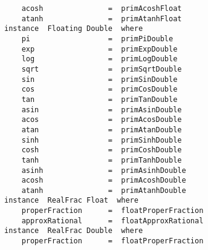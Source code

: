 \mbox{\tt \ \ \ \ acosh\ \ \ \ \ \ \ \ \ \ \ \ \ \ \ =\ \ primAcoshFloat}\\
\mbox{\tt \ \ \ \ atanh\ \ \ \ \ \ \ \ \ \ \ \ \ \ \ =\ \ primAtanhFloat}
\eprogB\noindent\bprogB
\mbox{\tt instance\ \ Floating\ Double\ \ where}\\
\mbox{\tt \ \ \ \ pi\ \ \ \ \ \ \ \ \ \ \ \ \ \ \ \ \ \ =\ \ primPiDouble}\\
\mbox{\tt \ \ \ \ exp\ \ \ \ \ \ \ \ \ \ \ \ \ \ \ \ \ =\ \ primExpDouble}\\
\mbox{\tt \ \ \ \ log\ \ \ \ \ \ \ \ \ \ \ \ \ \ \ \ \ =\ \ primLogDouble}\\
\mbox{\tt \ \ \ \ sqrt\ \ \ \ \ \ \ \ \ \ \ \ \ \ \ \ =\ \ primSqrtDouble}\\
\mbox{\tt \ \ \ \ sin\ \ \ \ \ \ \ \ \ \ \ \ \ \ \ \ \ =\ \ primSinDouble}\\
\mbox{\tt \ \ \ \ cos\ \ \ \ \ \ \ \ \ \ \ \ \ \ \ \ \ =\ \ primCosDouble}\\
\mbox{\tt \ \ \ \ tan\ \ \ \ \ \ \ \ \ \ \ \ \ \ \ \ \ =\ \ primTanDouble}\\
\mbox{\tt \ \ \ \ asin\ \ \ \ \ \ \ \ \ \ \ \ \ \ \ \ =\ \ primAsinDouble}\\
\mbox{\tt \ \ \ \ acos\ \ \ \ \ \ \ \ \ \ \ \ \ \ \ \ =\ \ primAcosDouble}\\
\mbox{\tt \ \ \ \ atan\ \ \ \ \ \ \ \ \ \ \ \ \ \ \ \ =\ \ primAtanDouble}\\
\mbox{\tt \ \ \ \ sinh\ \ \ \ \ \ \ \ \ \ \ \ \ \ \ \ =\ \ primSinhDouble}\\
\mbox{\tt \ \ \ \ cosh\ \ \ \ \ \ \ \ \ \ \ \ \ \ \ \ =\ \ primCoshDouble}\\
\mbox{\tt \ \ \ \ tanh\ \ \ \ \ \ \ \ \ \ \ \ \ \ \ \ =\ \ primTanhDouble}\\
\mbox{\tt \ \ \ \ asinh\ \ \ \ \ \ \ \ \ \ \ \ \ \ \ =\ \ primAsinhDouble}\\
\mbox{\tt \ \ \ \ acosh\ \ \ \ \ \ \ \ \ \ \ \ \ \ \ =\ \ primAcoshDouble}\\
\mbox{\tt \ \ \ \ atanh\ \ \ \ \ \ \ \ \ \ \ \ \ \ \ =\ \ primAtanhDouble}
\eprogB\noindent\bprogB
\mbox{\tt instance\ \ RealFrac\ Float\ \ where}\\
\mbox{\tt \ \ \ \ properFraction\ \ \ \ \ \ =\ \ floatProperFraction}\\
\mbox{\tt \ \ \ \ approxRational\ \ \ \ \ \ =\ \ floatApproxRational}
\eprogB\noindent\bprogB
\mbox{\tt instance\ \ RealFrac\ Double\ \ where}\\
\mbox{\tt \ \ \ \ properFraction\ \ \ \ \ \ =\ \ floatProperFraction}\\
